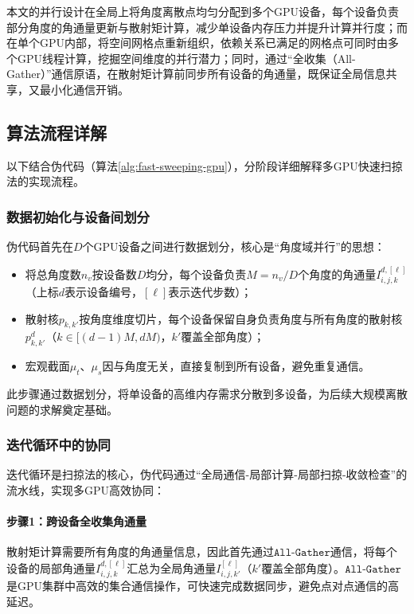 本文的并行设计在全局上将角度离散点均匀分配到多个GPU设备，每个设备负责部分角度的角通量更新与散射矩计算，减少单设备内存压力并提升计算并行度；而在单个GPU内部，将空间网格点重新组织，依赖关系已满足的网格点可同时由多个GPU线程计算，挖掘空间维度的并行潜力；同时，通过“全收集（All-Gather）”通信原语，在散射矩计算前同步所有设备的角通量，既保证全局信息共享，又最小化通信开销。

\subsection{算法流程详解}

以下结合伪代码（算法\ref{alg:fast-sweeping-gpu}），分阶段详细解释多GPU快速扫掠法的实现流程。

\subsubsection{数据初始化与设备间划分}
伪代码首先在$D$个GPU设备之间进行数据划分，核心是“角度域并行”的思想：
\begin{itemize}
    \item 将总角度数$n_v$按设备数$D$均分，每个设备负责$M = n_v / D$个角度的角通量$I^{d,[\ell]}_{i,j,k}$（上标$d$表示设备编号，$[\ell]$表示迭代步数）；
    \item 散射核$p_{k,k'}$按角度维度切片，每个设备保留自身负责角度与所有角度的散射核$p^d_{k,k'}$（$k \in [(d-1)M, dM)$，$k'$覆盖全部角度）；
    \item 宏观截面$\mu_t$、$\mu_s$因与角度无关，直接复制到所有设备，避免重复通信。
\end{itemize}
此步骤通过数据划分，将单设备的高维内存需求分散到多设备，为后续大规模离散问题的求解奠定基础。

\subsubsection{迭代循环中的协同}
迭代循环是扫掠法的核心，伪代码通过“全局通信-局部计算-局部扫掠-收敛检查”的流水线，实现多GPU高效协同：

\paragraph{步骤1：跨设备全收集角通量}
散射矩计算需要所有角度的角通量信息，因此首先通过$\texttt{All-Gather}$通信，将每个设备的局部角通量$I^{d,[\ell]}_{i,j,k}$汇总为全局角通量$I^{[\ell]}_{i,j,k'}$（$k'$覆盖全部角度）。$\texttt{All-Gather}$是GPU集群中高效的集合通信操作，可快速完成数据同步，避免点对点通信的高延迟。

